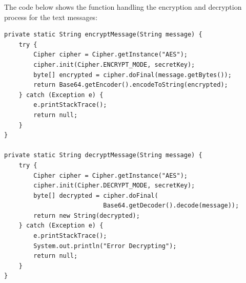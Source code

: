 \documentclass[12pt]{report}
\begin{document}
The code below shows the function handling the encryption and decryption process for the text messages:
\begin{lstlisting}[style=javastyle]
private static String encryptMessage(String message) {
	try {
		Cipher cipher = Cipher.getInstance("AES");
		cipher.init(Cipher.ENCRYPT_MODE, secretKey);
		byte[] encrypted = cipher.doFinal(message.getBytes());
		return Base64.getEncoder().encodeToString(encrypted);
	} catch (Exception e) {
		e.printStackTrace();
		return null;
	}
}

private static String decryptMessage(String message) {
	try {
		Cipher cipher = Cipher.getInstance("AES");
		cipher.init(Cipher.DECRYPT_MODE, secretKey);
		byte[] decrypted = cipher.doFinal(
                           Base64.getDecoder().decode(message));
		return new String(decrypted);
	} catch (Exception e) {
		e.printStackTrace();
		System.out.println("Error Decrypting");
		return null;
	}
}
\end{lstlisting}
\end{document}
